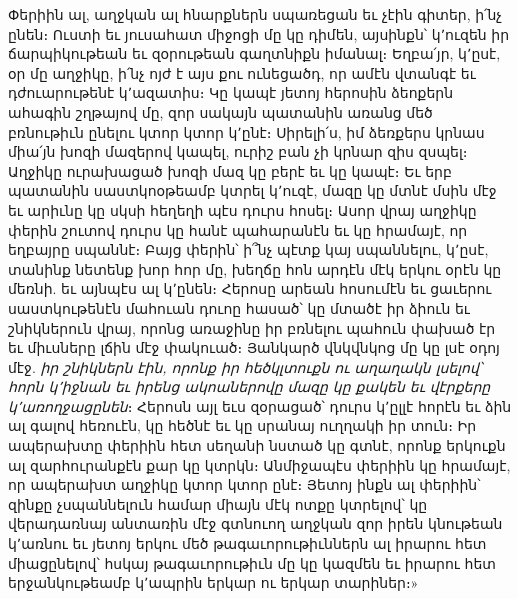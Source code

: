 \documentclass{article}
\begin{document}
{Փերիին ալ, աղջկան ալ հնարքներն սպառեցան եւ չէին գիտեր, ի՛նչ ընեն։ Ուստի եւ յուսահատ միջոցի մը կը դիմեն, այսինքն՝ կ՚ուզեն իր ճարպիկութեան եւ զօրութեան գաղտնիքն իմանալ։ Եղբա՛յր, կ՚ըսէ, օր մը աղջիկը, ի՛նչ ոյժ է այս քու ունեցածդ, որ ամէն վտանգէ եւ դժուարութենէ կ՚ազատիս։ Կը կապէ յետոյ հերոսին ձեոքերն ահագին շղթայով մը, զոր սակայն պատանին առանց մեծ բռնութիւն ընելու կտոր կտոր կ՚ընէ։ Սիրելի՛ս, իմ ձեռքերս կրնաս միա՛յն խոզի մազերով կապել, ուրիշ բան չի կրնար զիս զսպել։ Աղջիկը ուրախացած խոզի մազ կը բերէ եւ կը կապէ։ Եւ երբ պատանին սաստկոօթեամբ կտրել կ՚ուզէ, մազը կը մտնէ մսին մէջ եւ արիւնը կը սկսի հեղեղի պէս դուրս հոսել։ Ասոր վրայ աղջիկը փերին շուտով դուրս կը հանէ պահարանէն եւ կը հրամայէ, որ եղբայրը սպաննէ։ Բայց փերին՝ ի՞նչ պէտք կայ սպաննելու, կ՚ըսէ, տանինք նետենք խոր հոր մը, խեղճը հոն արդէն մէկ երկու օրէն կը մեռնի. եւ այնպէս ալ կ՚ընեն։ Հերոսը արեան հոսումէն եւ ցաւերու սաստկութենէն մահուան դուոը հասած՝ կը մտածէ իր ձիուն եւ շնիկներուն վրայ, որոնց առաջինը իր բռնելու պահուն փախած էր եւ միւսները լճին մէջ փակուած։ Յանկարծ վնկվնկոց մը կը լսէ օդոյ մէջ. \emph{իր շնիկներն էին, որոնք իր հեծկլտուքն ու աղաղակն լսելով՝ հորն կ՚իջնան եւ իրենց ակոաներովը մազը կը քակեն եւ վէրքերը կ՚առողջացընեն}։ Հերոսն այլ եւս զօրացած՝ դուրս կ՚ըլլէ հորէն եւ ձին ալ գալով հեռուէն, կը հեծնէ եւ կը սրանայ ուղղակի իր տուն։ Իր ապերախտը փերիին հետ սեղանի նստած կը գտնէ, որոնք երկուքն ալ զարհուրանքէն քար կը կտրկն։ Անմիջապէս փերիին կը հրամայէ, որ ապերախտ աղջիկը կտոր կտոր ընէ։ Յետոյ ինքն ալ փերիին՝ զինքը չսպաննելուն համար միայն մէկ ոտքը կտրելով՝ կը վերադառնայ անտառին մէջ գտնուող աղջկան զոր իրեն կնութեան կ՚առնու եւ յետոյ երկու մեծ թագաւորութիւններն ալ իրարու հետ միացընելով՝ հսկայ թագաւորութիւն մը կը կազմեն եւ իրարու հետ երջանկութեամբ կ՚ապրին երկար ու երկար տարիներ։»

}
\end{document}
